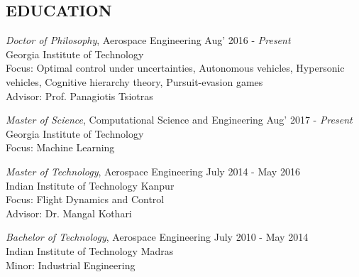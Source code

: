 \documentclass[margin, 10pt]{res} %
\begin{document}
\begin{resume}

 



\section{EDUCATION}

{\sl Doctor of Philosophy}, Aerospace Engineering \hfill Aug' 2016 - \emph{Present} \\
Georgia Institute of Technology \\
Focus: Optimal control under uncertainties, Autonomous vehicles, Hypersonic vehicles, Cognitive hierarchy theory, Pursuit-evasion games \\
Advisor: Prof. Panagiotis Tsiotras

{\sl Master of Science}, Computational Science and Engineering \hfill Aug' 2017 - \emph{Present} \\
Georgia Institute of Technology \\
Focus: Machine Learning

{\sl Master of Technology}, Aerospace Engineering \hfill July 2014 - May 2016 \\
Indian Institute of Technology Kanpur \\
Focus: Flight Dynamics and Control\\
Advisor: Dr. Mangal Kothari

{\sl Bachelor of Technology}, Aerospace Engineering  \hfill July 2010 - May 2014 \\
Indian Institute of Technology Madras \\
Minor: Industrial Engineering
 
 

\end{resume}
\end{document}
